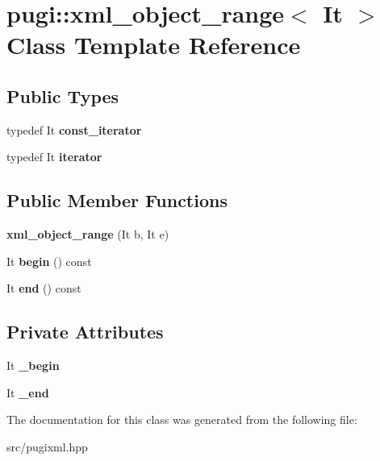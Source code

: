 \hypertarget{classpugi_1_1xml__object__range}{}\section{pugi\+:\+:xml\+\_\+object\+\_\+range$<$ It $>$ Class Template Reference}
\label{classpugi_1_1xml__object__range}
\subsection*{Public Types}
\begin{DoxyCompactItemize}
\item 
\mbox{\label{classpugi_1_1xml__object__range_ace38fcf448c7134e13612f7ce439246c}} 
typedef It {\bfseries const\+\_\+iterator}
\item 
\mbox{\label{classpugi_1_1xml__object__range_a024ce5292d3b9f2164c1230855fdb501}} 
typedef It {\bfseries iterator}
\end{DoxyCompactItemize}
\subsection*{Public Member Functions}
\begin{DoxyCompactItemize}
\item 
\mbox{\label{classpugi_1_1xml__object__range_abf214db65eac081e4478169cb03bce67}} 
{\bfseries xml\+\_\+object\+\_\+range} (It b, It e)
\item 
\mbox{\label{classpugi_1_1xml__object__range_a10f4f757413e31861f8dec21bb4f8dec}} 
It {\bfseries begin} () const
\item 
\mbox{\label{classpugi_1_1xml__object__range_ac719fcaad171adb58b90b7f8973cbd9a}} 
It {\bfseries end} () const
\end{DoxyCompactItemize}
\subsection*{Private Attributes}
\begin{DoxyCompactItemize}
\item 
\mbox{\label{classpugi_1_1xml__object__range_a68ed94ce08acb8b9b2c7f7be93d093a7}} 
It {\bfseries \+\_\+begin}
\item 
\mbox{\label{classpugi_1_1xml__object__range_af76a51bf973137d5c99fcbcb8195be9b}} 
It {\bfseries \+\_\+end}
\end{DoxyCompactItemize}


The documentation for this class was generated from the following file\+:\begin{DoxyCompactItemize}
\item 
src/pugixml.\+hpp\end{DoxyCompactItemize}
